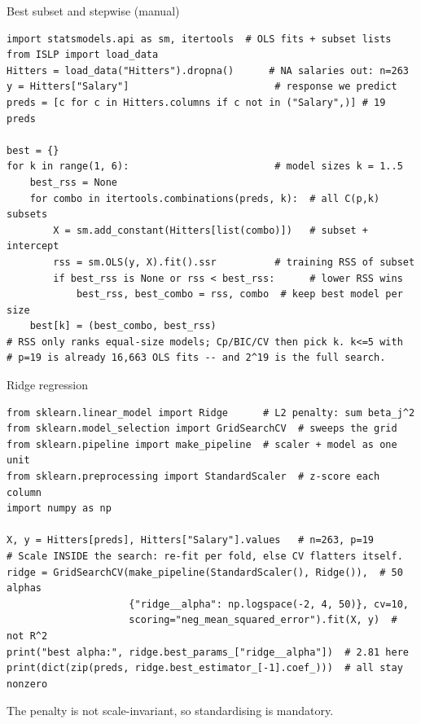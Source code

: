 \documentclass[aspectratio=169,11pt]{beamer}
\begin{document}

\begin{frame}[fragile]{Best subset and stepwise (manual)}
  \begin{lstlisting}
import statsmodels.api as sm, itertools  # OLS fits + subset lists
from ISLP import load_data
Hitters = load_data("Hitters").dropna()      # NA salaries out: n=263
y = Hitters["Salary"]                         # response we predict
preds = [c for c in Hitters.columns if c not in ("Salary",)] # 19 preds

best = {}
for k in range(1, 6):                         # model sizes k = 1..5
    best_rss = None
    for combo in itertools.combinations(preds, k):  # all C(p,k) subsets
        X = sm.add_constant(Hitters[list(combo)])   # subset + intercept
        rss = sm.OLS(y, X).fit().ssr          # training RSS of subset
        if best_rss is None or rss < best_rss:      # lower RSS wins
            best_rss, best_combo = rss, combo  # keep best model per size
    best[k] = (best_combo, best_rss)
# RSS only ranks equal-size models; Cp/BIC/CV then pick k. k<=5 with
# p=19 is already 16,663 OLS fits -- and 2^19 is the full search.
  \end{lstlisting}
\end{frame}

\begin{frame}[fragile]{Ridge regression}\label{frm:labridge}
  \begin{lstlisting}
from sklearn.linear_model import Ridge      # L2 penalty: sum beta_j^2
from sklearn.model_selection import GridSearchCV  # sweeps the grid
from sklearn.pipeline import make_pipeline  # scaler + model as one unit
from sklearn.preprocessing import StandardScaler  # z-score each column
import numpy as np

X, y = Hitters[preds], Hitters["Salary"].values   # n=263, p=19
# Scale INSIDE the search: re-fit per fold, else CV flatters itself.
ridge = GridSearchCV(make_pipeline(StandardScaler(), Ridge()),  # 50 alphas
                     {"ridge__alpha": np.logspace(-2, 4, 50)}, cv=10,
                     scoring="neg_mean_squared_error").fit(X, y)  # not R^2
print("best alpha:", ridge.best_params_["ridge__alpha"])  # 2.81 here
print(dict(zip(preds, ridge.best_estimator_[-1].coef_)))  # all stay nonzero
  \end{lstlisting}
  \begin{readme}
    The penalty is not scale-invariant, so standardising is mandatory.
  \end{readme}
\end{frame}
\end{document}
